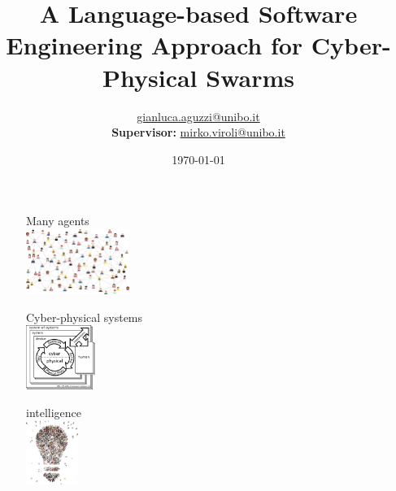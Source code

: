\documentclass[presentation, 9pt, aspectratio=169]{beamer}\mode<presentation>{\usetheme{AMSBolognaFC}}
\title[A Soft-Eng Approach for CPSWs!]
{A Language-based Software Engineering Approach for Cyber-Physical Swarms}
\author[\sspeaker{G.Aguzzi}]
{\speaker{Gianluca Aguzzi} \href{mailto:gianluca.aguzzi@unibo.it}{gianluca.aguzzi@unibo.it} \\
\textbf{Supervisor:} \speaker{Mirko Viroli} \href{mailto:mirko.viroli@unibo.it}{mirko.viroli@unibo.it}}
\institute[DISI, Univ.\ Bologna]
{%
\textsc{Alma Mater Studiorum} -- Universit{\`a} di Bologna \\[0.1cm]
\textbf{Final Year PhD Report}\\[0.15cm]
}
\date[\today]{\today}
\begin{document}

\frame{\titlepage}

\section*{\refname}

\begin{frame}
\centering
{}
\begin{multicols}{3}
	\begin{figure}
		\large{Many  agents}\\[0.1cm]
		\includegraphics[width=0.3\textwidth]{img/network.png}
	\end{figure}
	\begin{figure}
		\large{Cyber-physical systems}\\[0.1cm]
		\includegraphics[width=0.2\textwidth]{img/cps.png}
	\end{figure}
	\begin{figure}
		\large{ intelligence}\\[0.1cm]
		\includegraphics[width=0.15\textwidth]{img/ci.png}
	\end{figure}
\end{multicols}
\end{frame}
\end{document}
